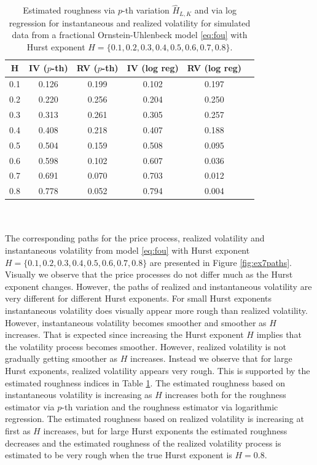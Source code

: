 \documentclass{article}
\begin{document}
\begin{table}[htbp]
    \centering
    \begin{tabular}{cccccc}
        \toprule
        H & IV ($p$-th) & RV ($p$-th) & IV (log reg) & RV (log reg)\\
        \midrule
        0.1 & 0.126 & 0.199 & 0.102 & 0.197\\
        0.2 & 0.220 & 0.256 & 0.204 & 0.250\\
        0.3 & 0.313 & 0.261 & 0.305 & 0.257\\
        0.4 & 0.408 & 0.218 & 0.407 & 0.188\\
        0.5 & 0.504 & 0.159 & 0.508 & 0.095\\
        0.6 & 0.598 & 0.102 & 0.607 & 0.036\\
        0.7 & 0.691 & 0.070 & 0.703 & 0.012\\
        0.8 & 0.778 & 0.052 & 0.794 & 0.004\\
        \bottomrule
    \end{tabular}
    \caption{Estimated roughness via $p$-th variation $\widehat{H}_{L,K}$ and via log regression for instantaneous and realized volatility for simulated data from a fractional Ornstein-Uhlenbeck model \eqref{eq:fou} with Hurst exponent $H=\{0.1,0.2,0.3,0.4,0.5,0.6,0.7,0.8\}$.}
    \label{tab:ex7table}
\end{table}\\\\
The corresponding paths for the price process, realized volatility and instantaneous volatility from model \eqref{eq:fou} with Hurst exponent $H=\{0.1,0.2,0.3,0.4,0.5,0.6,0.7,0.8\}$ are presented in Figure \ref{fig:ex7paths}. Visually we observe that the price processes do not differ much as the Hurst exponent changes. However, the paths of realized and instantaneous volatility are very different for different Hurst exponents. For small Hurst exponents instantaneous volatility does visually appear more rough than realized volatility. However, instantaneous volatility becomes smoother and smoother as $H$ increases. That is expected since increasing the Hurst exponent $H$ implies that the volatility process becomes smoother. However, realized volatility is not gradually getting smoother as $H$ increases. Instead we observe that for large Hurst exponents, realized volatility appears very rough. This is supported by the estimated roughness indices in Table \ref{tab:ex7table}. The estimated roughness based on instantaneous volatility is increasing as $H$ increases both for the roughness estimator via $p$-th variation and the roughness estimator via logarithmic regression. The estimated roughness based on realized volatility is increasing at first as $H$ increases, but for large Hurst exponents the estimated roughness decreases and the estimated roughness of the realized volatility process is estimated to be very rough when the true Hurst exponent is $H=0.8$. 
\end{document}
